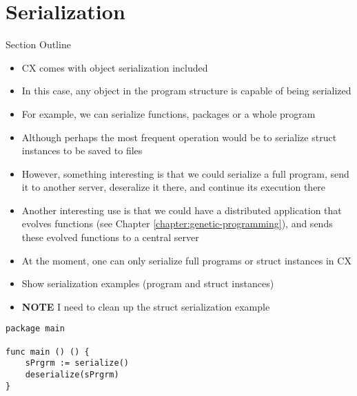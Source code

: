 \documentclass[11pt,fleqn,openany]{book} %
\begin{document}

\chapter{Serialization}
\label{chapter:serialization}

\begin{remark}
Section Outline
    \begin{itemize}
    	\item CX comes with object serialization included
        \item In this case, any object in the program structure is capable of being serialized
        \item For example, we can serialize functions, packages or a whole program
        \item Although perhaps the most frequent operation would be to serialize struct instances to be saved to files
        \item However, something interesting is that we could serialize a full program, send it to another server, deseralize it there, and continue its execution there
        \item Another interesting use is that we could have a distributed application that evolves functions (see Chapter \ref{chapter:genetic-programming}), and sends these evolved functions to a central server
        \item At the moment, one can only serialize full programs or struct instances in CX
        \item Show serialization examples (program and struct instances)
        \item \textbf{NOTE} I need to clean up the struct serialization example
    \end{itemize}
\end{remark}

\begin{lstlisting}[caption={Serialization Example},captionpos=b,label={listing:serialization-example}]
package main

func main () () {
	sPrgrm := serialize()
	deserialize(sPrgrm)
}
\end{lstlisting}
\end{document}
